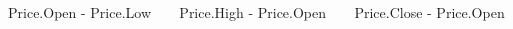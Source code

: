 \documentclass[final, xcolor=table]{beamer}\usepackage[]{graphicx}\usepackage[]{color}
\begin{document}
\begin{frame}
\begin{columns}[t]

\begin{column}{.24 \linewidth}

  \begin{block}{\small {Price.Open - Price.Low}}


  \end{block}

\end{column}


\begin{column}{.24 \linewidth}

  \begin{block}{\small {Price.High - Price.Open}}


  \end{block}
  
\end{column}



\begin{column}{.24 \linewidth}

  \begin{block}{\small {Price.Close - Price.Open}}


\end{block}
\end{column}
\end{columns}
\end{frame}
\end{document}
